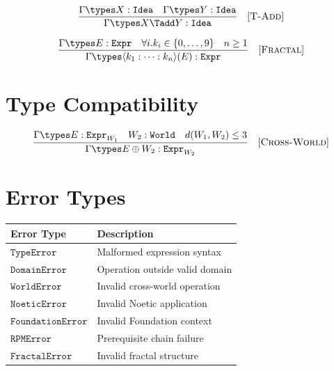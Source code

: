 \begin{definition}
\label{def:tadd-rule}
\[
\frac{\Gamma \types X : \mathtt{Idea} \quad \Gamma \types Y : \mathtt{Idea}}{\Gamma \types X \Tadd Y : \mathtt{Idea}} \quad [\textsc{T-Add}]
\]
\end{definition}

\begin{definition}
\label{def:fractal-rule}
\[
\frac{\Gamma \types E : \mathtt{Expr} \quad \forall i. k_i \in \{0,\ldots,9\} \quad n \geq 1}{\Gamma \types \langle k_1 : \cdots : k_n \rangle(E) : \mathtt{Expr}} \quad [\textsc{Fractal}]
\]
\end{definition}

\section{Type Compatibility}

\begin{definition}
\label{def:cross-world}
\[
\frac{\Gamma \types E : \mathtt{Expr}_{W_1} \quad W_2 : \mathtt{World} \quad d(W_1, W_2) \leq 3}{\Gamma \types E \oplus W_2 : \mathtt{Expr}_{W_2}} \quad [\textsc{Cross-World}]
\]
\end{definition}

\section{Error Types}

\begin{definition}
\label{def:error-types}
\begin{center}
\begin{tabular}{ll}
\toprule
\textbf{Error Type} & \textbf{Description} \\
\midrule
$\mathtt{TypeError}$ & Malformed expression syntax \\
$\mathtt{DomainError}$ & Operation outside valid domain \\
$\mathtt{WorldError}$ & Invalid cross-world operation \\
$\mathtt{NoeticError}$ & Invalid Noetic application \\
$\mathtt{FoundationError}$ & Invalid Foundation context \\
$\mathtt{RPMError}$ & Prerequisite chain failure \\
$\mathtt{FractalError}$ & Invalid fractal structure \\
\bottomrule
\end{tabular}
\end{center}
\end{definition}

